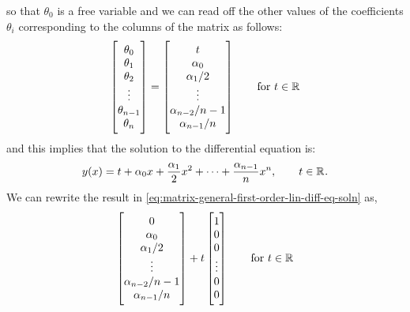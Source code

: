 \documentclass[../MathsNotesBase.tex]{subfiles}
\begin{document}
{		so that $\theta_0$ is a free variable and we can read off the other values of the coefficients $\theta_i$ corresponding to the columns of the matrix as follows:
		\begin{equation}\label{eq:matrix-general-first-order-lin-diff-eq-soln}
			\begin{bmatrix}\theta_0\\\theta_1\\\theta_2\\\vdots\\\theta_{n-1}\\\theta_n\end{bmatrix} =
			\begin{bmatrix}t\\\alpha_0\\\alpha_1/2\\\vdots\\\alpha_{n-2}/n-1\\\alpha_{n-1}/n\end{bmatrix} \hspace{20pt} \text{for } t \in \mathbb{R}^{}
		\end{equation}
		and this implies that the solution to the differential equation is:
		\begin{equation}\label{eq:general-first-order-lin-diff-eq-soln}
			y(x) = t + \alpha_0 x + \frac{\alpha_1}{2} x^2 + \cdots + \frac{\alpha_{n-1}}{n} x^n, \hspace{20pt} t \in \mathbb{R}^{}.
		\end{equation}
		We can rewrite the result in \autoref{eq:matrix-general-first-order-lin-diff-eq-soln} as,
		\begin{equation}
			\begin{bmatrix}0\\\alpha_0\\\alpha_1/2\\\vdots\\\alpha_{n-2}/n-1\\\alpha_{n-1}/n\end{bmatrix} + t\begin{bmatrix}1\\0\\0\\\vdots\\0\\0\end{bmatrix}
			\hspace{20pt} \text{for } t \in \mathbb{R}^{}
		\end{equation}
}
\end{document}
